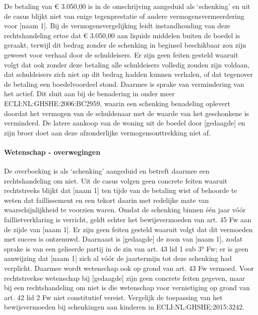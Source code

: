 \documentclass[
  dutch,
  a4paper,
]{article}
\begin{document}
De betaling van € 3.050,00 is in de omschrijving aangeduid als `schenking' en uit de casus blijkt niet van enige tegenprestatie of andere vermogensvermeerdering voor {[}naam 1{]}. Bij de vermogensvergelijking leidt instandhouding van deze rechtshandeling ertoe dat € 3.050,00 aan liquide middelen buiten de boedel is geraakt, terwijl dit bedrag zonder de schenking in beginsel beschikbaar zou zijn geweest voor verhaal door de schuldeisers. Er zijn geen feiten gesteld waaruit volgt dat ook zonder deze betaling alle schuldeisers volledig zouden zijn voldaan, dat schuldeisers zich niet op dit bedrag hadden kunnen verhalen, of dat tegenover de betaling een boedelvoordeel stond. Daarmee is sprake van vermindering van het actief. Dit sluit aan bij de benadering in onder meer ECLI:NL:GHSHE:2006:BC2959, waarin een schenking benadeling oplevert doordat het vermogen van de schuldenaar met de waarde van het geschonkene is verminderd. De latere aankoop van de woning uit de boedel door {[}gedaagde{]} en zijn broer doet aan deze afzonderlijke vermogensonttrekking niet af.

\paragraph{Wetenschap - overwegingen}\label{wetenschap---overwegingen-31}

De overboeking is als `schenking' aangeduid en betreft daarmee een rechtshandeling om niet. Uit de casus volgen geen concrete feiten waaruit rechtstreeks blijkt dat {[}naam 1{]} ten tijde van de betaling wist of behoorde te weten dat faillissement en een tekort daarin met redelijke mate van waarschijnlijkheid te voorzien waren. Omdat de schenking binnen één jaar vóór faillietverklaring is verricht, geldt echter het bewijsvermoeden van art. 45 Fw aan de zijde van {[}naam 1{]}. Er zijn geen feiten gesteld waaruit volgt dat dit vermoeden met succes is ontzenuwd. Daarnaast is {[}gedaagde{]} de zoon van {[}naam 1{]}, zodat sprake is van een gelieerde partij in de zin van art. 43 lid 1 sub 3° Fw; er is geen aanwijzing dat {[}naam 1{]} zich al vóór de jaartermijn tot deze schenking had verplicht. Daarmee wordt wetenschap ook op grond van art. 43 Fw vermoed. Voor rechtstreekse wetenschap bij {[}gedaagde{]} zijn geen concrete feiten gegeven, maar bij een rechtshandeling om niet is die wetenschap voor vernietiging op grond van art. 42 lid 2 Fw niet constitutief vereist. Vergelijk de toepassing van het bewijsvermoeden bij schenkingen aan kinderen in ECLI:NL:GHSHE:2015:3242.
\end{document}
